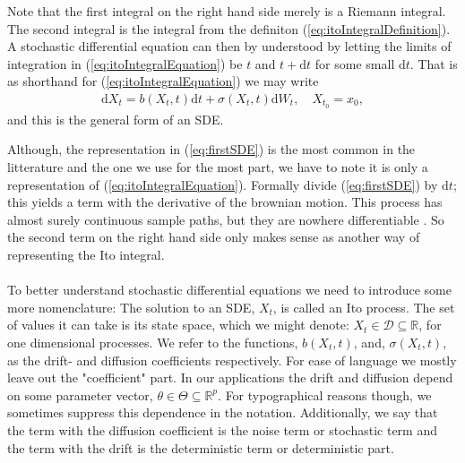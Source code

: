 Note that the first integral on the right hand side merely is a Riemann integral. The second integral is the integral from the definiton (\ref{eq:itoIntegralDefinition}). A stochastic differential equation can then by understood by letting the limits of integration in (\ref{eq:itoIntegralEquation}) be $t$ and $t+\mathrm{d}t$ for some small $\mathrm{d}t$. That is as shorthand for (\ref{eq:itoIntegralEquation}) we may write
\begin{align}
    \mathrm{d}X_t = b(X_t, t)\mathrm{d}t + \sigma(X_t, t)\mathrm{d}W_t, \quad X_{t_0} = x_0 \label{eq:firstSDE},
\end{align}
and this is the general form of an SDE. 

Although, the representation in (\ref{eq:firstSDE}) is the most common in the litterature and the one we use for the most part, we have to note it is only a representation of (\ref{eq:itoIntegralEquation}). Formally divide (\ref{eq:firstSDE}) by $\mathrm{d}t$; this yields a term with the derivative of the brownian motion. This process has almost surely continuous sample paths, but they are nowhere differentiable \cite[theorem 11.22 and theorem 11.35]{Hansen2022}. So the second term on the right hand side only makes sense as another way of representing the Ito integral. \\\\
To better understand stochastic differential equations we need to introduce some more nomenclature: The solution to an SDE, $X_t$, is called an Ito process. The set of values it can take is its state space, which we might denote: $X_t\in\mathcal{D}\subseteq\mathbb{R}$, for one dimensional processes. We refer to the functions, $b(X_t, t)$, and, $\sigma(X_t, t)$, as the drift- and diffusion coefficients respectively. For ease of language we mostly leave out the "coefficient" part. In our applications the drift and diffusion depend on some parameter vector, $\theta\in\Theta\subseteq\mathbb{R}^p$. For typographical reasons though, we sometimes suppress this dependence in the notation. Additionally, we say that the term with the diffusion coefficient is the noise term or stochastic term and the term with the drift is the deterministic term or deterministic part. 


